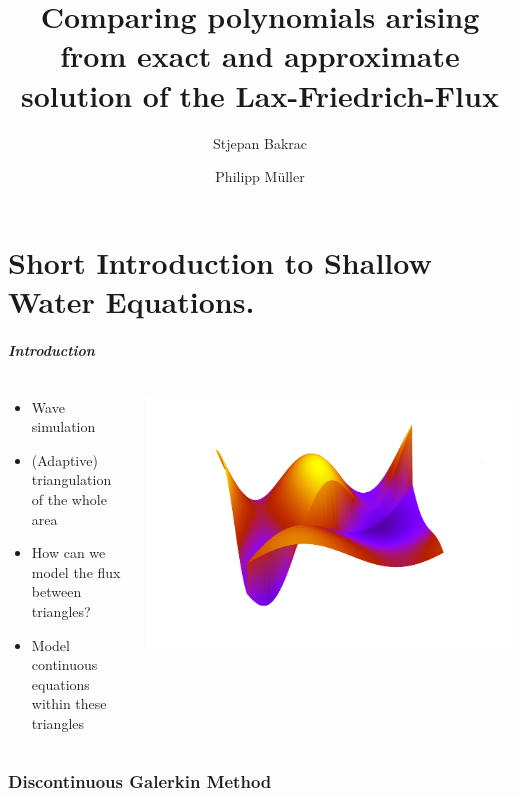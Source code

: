 \documentclass{beamer}
\title{Comparing polynomials arising from exact and approximate solution of the Lax-Friedrich-Flux}
\author{Stjepan Bakrac \and Philipp Müller}
\date{}
\begin{document}
\part{Short Introduction to Shallow Water Equations.}
\label{part:introduction}

\begin{frame}
  \frametitle{Introduction}
  \begin{columns}
    \begin{column}{.5\textwidth}
      \begin{itemize}
      \item Wave simulation
      \item (Adaptive) triangulation of the whole area
      \item How can we model the flux between triangles?
      \item Model continuous equations within these triangles
      \end{itemize}    
    \end{column}
  \end{columns}
\end{frame}

\section{Discontinuous Galerkin Method}
\label{sec:basis-functions-intro}
\end{document}
